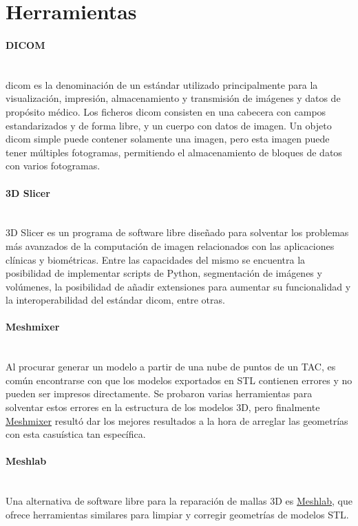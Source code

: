\section{Herramientas}
    \paragraph{DICOM}~\\
    \acrshort{dicom} es la denominación de un estándar utilizado principalmente para la visualización, impresión, almacenamiento y transmisión de imágenes y datos de propósito médico.
    Los ficheros \acrshort{dicom} consisten en una cabecera con campos estandarizados y de forma libre, y un cuerpo con datos de imagen. Un objeto \acrshort{dicom} simple puede contener solamente una imagen, pero esta imagen puede tener múltiples fotogramas, permitiendo el almacenamiento de bloques de datos con varios fotogramas.
   
    \paragraph{3D Slicer}~\\
3D Slicer es un programa de software libre diseñado para solventar los problemas más avanzados de la computación de imagen relacionados con las aplicaciones clínicas y biométricas. Entre las capacidades del mismo se encuentra la posibilidad de implementar scripts de Python, segmentación de imágenes y volúmenes, la posibilidad de añadir extensiones para aumentar su funcionalidad y la interoperabilidad del estándar \acrshort{dicom}, entre otras.

\paragraph{Meshmixer}~\\
Al procurar generar un modelo a partir de una nube de puntos de un TAC, es común encontrarse con que los modelos exportados en STL contienen errores y no pueden ser impresos directamente. Se probaron varias herramientas para solventar estos errores en la estructura de los modelos 3D, pero finalmente \href{https://www.meshmixer.com}{Meshmixer} resultó dar los mejores resultados a la hora de arreglar las geometrías con esta casuística tan específica.
    \paragraph{Meshlab}~\\
Una alternativa de software libre para la reparación de mallas 3D es \href{https://www.meshlab.net}{Meshlab}, que ofrece herramientas similares para limpiar y corregir geometrías de modelos STL.
